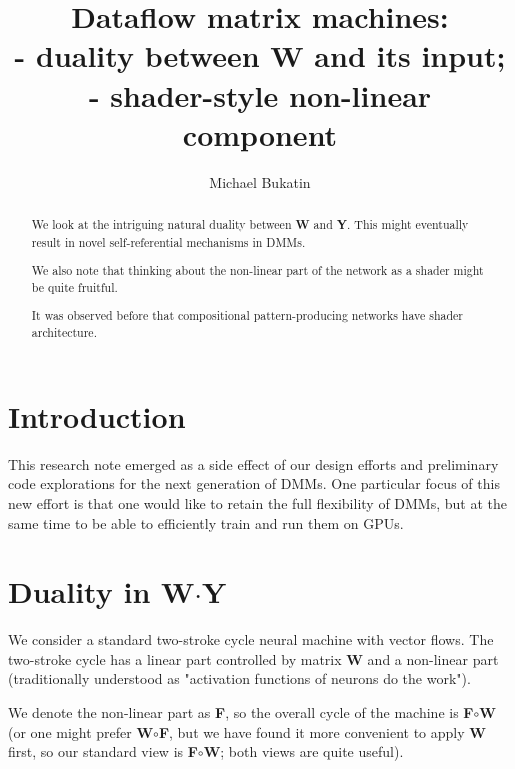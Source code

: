 \documentclass{article}
\title{Dataflow matrix machines:\\ - duality between {\bf W} and its input;
                                              \\ - shader-style non-linear component}
\author{Michael Bukatin}
\begin{document}
\maketitle

\begin{abstract}
We look at the intriguing natural duality between {\bf W} and {\bf Y}. This might eventually result in novel
self-referential mechanisms in DMMs. 

We also note that thinking about
the non-linear part of the network as a shader might be quite fruitful. 

It was observed before that compositional pattern-producing networks have shader architecture.


\end{abstract}

\section*{Introduction}

This research note emerged as a side effect of our design efforts and preliminary code explorations for the next generation of DMMs. One particular focus of this new effort is that one would like to retain the full flexibility of DMMs, but at the same time to be able to efficiently train and run them on GPUs.

\section{Duality in {\bf W}$\cdot${\bf Y}}

We consider a standard two-stroke cycle neural machine with vector flows. The two-stroke cycle has a linear part controlled by matrix {\bf W} and a non-linear part (traditionally understood as "activation functions of neurons do the work"). 

\smallskip

We denote the non-linear part as {\bf F}, so the overall cycle of the machine is {\bf F}$\circ${\bf W} (or one might prefer {\bf W}$\circ${\bf F}, but we have found it more convenient to apply {\bf W} first, so our standard view is {\bf F}$\circ${\bf W}; both views are quite useful).
\end{document}
